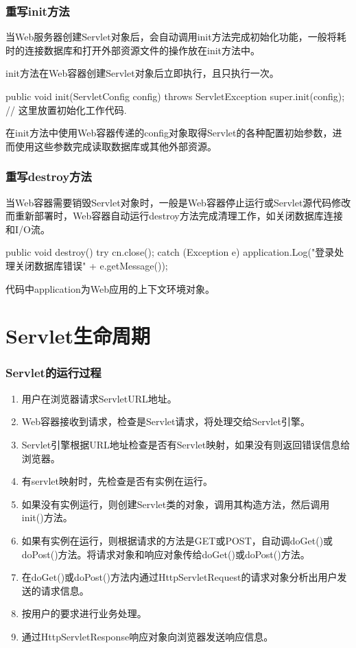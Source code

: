 \begin{frame}[fragile] %
\frametitle{重写init方法} 

当Web服务器创建Servlet对象后，会自动调用init方法完成初始化功能，一般将耗时的连接数据库和打开外部资源文件的操作放在init方法中。

init方法在Web容器创建Servlet对象后立即执行，且只执行一次。

\begin{javaCode}
public void init(ServletConfig config) throws ServletException {
  super.init(config);
  // 这里放置初始化工作代码.
}
\end{javaCode}

\kai 在init方法中使用Web容器传递的config对象取得Servlet的各种配置初始参数，进而使用这些参数完成读取数据库或其他外部资源。
\end{frame}

\begin{frame}[fragile] %
\frametitle{重写destroy方法} 

当Web容器需要销毁Servlet对象时，一般是Web容器停止运行或Servlet源代码修改而重新部署时，Web容器自动运行destroy方法完成清理工作，如关闭数据库连接和I/O流。

\begin{javaCode}
public  void destroy() {
  try {
    cn.close();
  } catch (Exception e) {
    application.Log("登录处理关闭数据库错误" + e.getMessage());
  }
}
\end{javaCode}

\kai 代码中application为Web应用的上下文环境对象。
\end{frame}

\section{Servlet生命周期}

\begin{frame}[fragile] %
\frametitle{Servlet的运行过程} 
\begin{enumerate}\kai
\item 用户在浏览器请求ServletURL地址。
\item Web容器接收到请求，检查是Servlet请求，将处理交给Servlet引擎。
\item Servlet引擎根据URL地址检查是否有Servlet映射，如果没有则返回错误信息给浏览器。
\item 有servlet映射时，先检查是否有实例在运行。
\item 如果没有实例运行，则创建Servlet类的对象，调用其构造方法，然后调用init()方法。
\item 如果有实例在运行，则根据请求的方法是GET或POST，自动调doGet()或doPost()方法。将请求对象和响应对象传给doGet()或doPost()方法。
\item 在doGet()或doPost()方法内通过HttpServletRequest的请求对象分析出用户发送的请求信息。
\item 按用户的要求进行业务处理。
\item 通过HttpServletResponse响应对象向浏览器发送响应信息。
\end{enumerate}
\end{frame}

